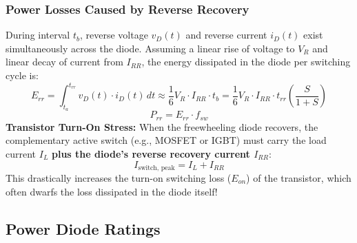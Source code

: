 \documentclass[11pt,a4paper]{article}
\begin{document}
\subsubsection{Power Losses Caused by Reverse Recovery}
During interval $t_b$, reverse voltage $v_D(t)$ and reverse current $i_D(t)$ exist simultaneously across the diode. Assuming a linear rise of voltage to $V_R$ and linear decay of current from $I_{RR}$, the energy dissipated in the diode per switching cycle is:
\begin{equation}
E_{rr} = \int_{t_a}^{t_{rr}} v_D(t) \cdot i_D(t) \, dt \approx \frac{1}{6} V_R \cdot I_{RR} \cdot t_b = \frac{1}{6} V_R \cdot I_{RR} \cdot t_{rr} \left(\frac{S}{1+S}\right)
\end{equation}
\begin{equation}
P_{rr} = E_{rr} \cdot f_{sw}
\end{equation}
\textbf{Transistor Turn-On Stress:} When the freewheeling diode recovers, the complementary active switch (e.g., MOSFET or IGBT) must carry the load current $I_L$ \textbf{plus the diode's reverse recovery current $I_{RR}$}:
\begin{equation}
I_{\text{switch, peak}} = I_L + I_{RR}
\end{equation}
This drastically increases the turn-on switching loss ($E_{on}$) of the transistor, which often dwarfs the loss dissipated in the diode itself!

\subsection{Power Diode Ratings}
\end{document}
